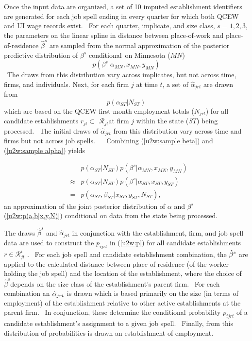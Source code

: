  Once the input data are organized, a set of 10 imputed
establishment identifiers are generated for each job spell ending in every
quarter for which both QCEW and UI wage records exist. \ For each quarter,
implicate, and size class, $s=1,2,3$, the parameters on the linear spline in
distance between place-of-work and place-of-residence $\hat{\beta}^{s}$ are
sampled from the normal approximation of the posterior predictive
distribution of $\beta ^{s}$ conditional\ on Minnesota ($MN$) 
\begin{equation}
p(\beta ^{s}|\alpha _{MN},x_{MN},y_{MN})  \label{u2w:sample beta}
\end{equation}%
\ The draws from this distribution vary across implicates, but not across
time, firms, and individuals.
%
Next, for each firm $j$ at time $t$, a set of $\hat{\alpha}_{jrt}$ are drawn
from%
\begin{equation}
p\left( \alpha _{ST}|N_{ST}\right)  \label{u2w:sample alpha}
\end{equation}%
which are based on the QCEW first-month employment totals ($N_{jrt}$) for
all candidate establishments $r_{jt}\subset $ $\mathcal{R}_{jt}$at firm $j$
within the state ($ST$) being processed. \ The initial draws of $\hat{\alpha}%
_{jrt}$ from this distribution vary across time and firms but not across job
spells. \ \ 
%
Combining (\ref{u2w:sample beta}) and (\ref{u2w:sample alpha}) yields

\begin{eqnarray}
&&p\left( \alpha _{ST}|N_{ST}\right) p(\beta ^{s}|\alpha _{MN},x_{MN},y_{MN})
\label{u2w:post mode ST} \\
&\approx &p\left( \alpha _{ST}|N_{ST}\right) p(\beta ^{s}|\alpha
_{ST},x_{ST},y_{ST})  \nonumber \\
&=&p\left( \alpha _{ST},\beta _{ST}|x_{ST},y_{ST},N_{ST}\right),  \nonumber
\end{eqnarray}%
an approximation of the joint posterior distribution of $\alpha $ and $\beta
^{s}$ (\ref{u2w:p(a,b|x,y,N)}) conditional on data from the state being
processed.

The draws $\hat{\beta}^{s}$ and $\hat{\alpha}_{jrt}$ in conjunction with the
establishment, firm, and job spell data are used to construct the $p_{ijrt}$
in (\ref{u2w:p}) for all candidate establishments $r\in \mathcal{R}_{jt}^{i}$%
. \ For each job spell and candidate establishment combination, the $\hat{%
\beta}^{s}$ are applied to the calculated distance between
place-of-residence (of the worker holding the job spell) and the location of
the establishment, where the choice of $\hat{\beta}^{s}$depends on the size
class of the establishment's parent firm. \ For each combination an $\hat{%
\alpha}_{jrt}$ is drawn which is based primarily on the size (in terms of
employment) of the establishment relative to other active establishments at
the parent firm. \ In conjunction, these determine the conditional
probability $p_{ijrt} $ of a candidate establishment's assignment to a given
job spell. \ Finally, from this distribution of probabilities is drawn an
establishment of employment.

